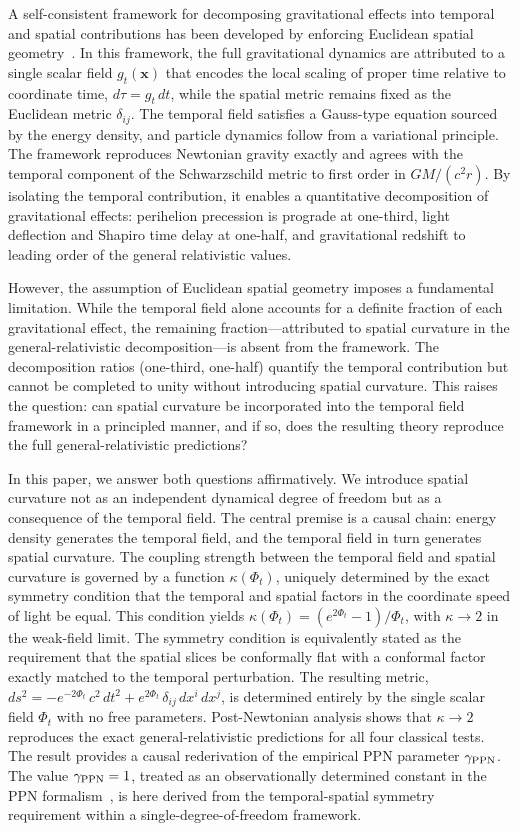 \documentclass[12pt]{article}
\begin{document}
A self-consistent framework for decomposing gravitational effects into temporal and spatial contributions has been developed by enforcing Euclidean spatial geometry~\cite{Gwak2026a}. In this framework, the full gravitational dynamics are attributed to a single scalar field $g_t(\mathbf{x})$ that encodes the local scaling of proper time relative to coordinate time, $d\tau = g_t\,dt$, while the spatial metric remains fixed as the Euclidean metric $\delta_{ij}$. The temporal field satisfies a Gauss-type equation sourced by the energy density, and particle dynamics follow from a variational principle. The framework reproduces Newtonian gravity exactly and agrees with the temporal component of the Schwarzschild metric to first order in $GM/(c^2 r)$. By isolating the temporal contribution, it enables a quantitative decomposition of gravitational effects: perihelion precession is prograde at one-third, light deflection and Shapiro time delay at one-half, and gravitational redshift to leading order of the general relativistic values.

However, the assumption of Euclidean spatial geometry imposes a fundamental limitation. While the temporal field alone accounts for a definite fraction of each gravitational effect, the remaining fraction---attributed to spatial curvature in the general-relativistic decomposition---is absent from the framework. The decomposition ratios (one-third, one-half) quantify the temporal contribution but cannot be completed to unity without introducing spatial curvature. This raises the question: can spatial curvature be incorporated into the temporal field framework in a principled manner, and if so, does the resulting theory reproduce the full general-relativistic predictions?

In this paper, we answer both questions affirmatively. We introduce spatial curvature not as an independent dynamical degree of freedom but as a consequence of the temporal field. The central premise is a causal chain: energy density generates the temporal field, and the temporal field in turn generates spatial curvature. The coupling strength between the temporal field and spatial curvature is governed by a function $\kappa(\Phi_t)$, uniquely determined by the exact symmetry condition that the temporal and spatial factors in the coordinate speed of light be equal. This condition yields $\kappa(\Phi_t) = (e^{2\Phi_t}-1)/\Phi_t$, with $\kappa \to 2$ in the weak-field limit. The symmetry condition is equivalently stated as the requirement that the spatial slices be conformally flat with a conformal factor exactly matched to the temporal perturbation. The resulting metric, $ds^2 = -e^{-2\Phi_t}\,c^2\,dt^2 + e^{2\Phi_t}\,\delta_{ij}\,dx^i\,dx^j$, is determined entirely by the single scalar field $\Phi_t$ with no free parameters. Post-Newtonian analysis shows that $\kappa \to 2$ reproduces the exact general-relativistic predictions for all four classical tests. The result provides a causal rederivation of the empirical PPN parameter $\gamma_{\rm PPN}$. The value $\gamma_{\rm PPN} = 1$, treated as an observationally determined constant in the PPN formalism~\cite{Will2014}, is here derived from the temporal-spatial symmetry requirement within a single-degree-of-freedom framework.
\end{document}
